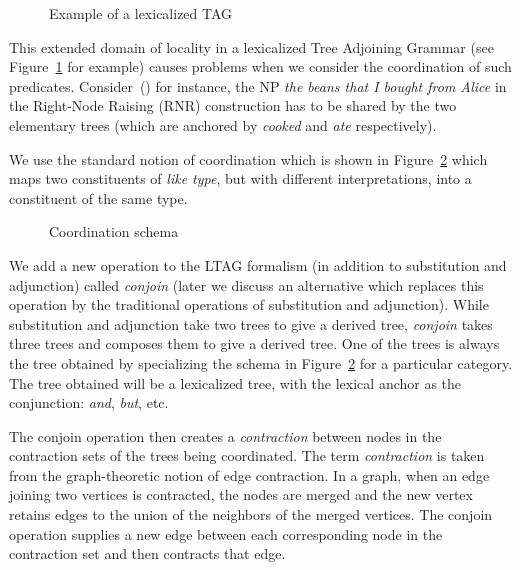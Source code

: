 \begin{figure}[htbp]
  \begin{center}
    \leavevmode
  \end{center}
  \caption{Example of a lexicalized TAG}
  \label{fig:tags}
\end{figure}

This extended domain of locality in a lexicalized Tree Adjoining
Grammar (see Figure~\ref{fig:tags} for example) causes problems when
we consider the coordination of such predicates. Consider~() for
instance, the NP {\em the beans that I bought from Alice} in the
Right-Node Raising (RNR) construction has to be shared by the two
elementary trees (which are anchored by {\em cooked} and {\em ate}
respectively).


We use the standard notion of coordination which is shown in
Figure~\ref{fig:conj} which maps two constituents of {\em like type},
but with different interpretations, into a constituent of the same
type.

\begin{figure}[htbp]
  \begin{center}
    \leavevmode
  \end{center}
  \caption{Coordination schema}
  \label{fig:conj}
\end{figure}

We add a new operation to the LTAG formalism (in addition to
substitution and adjunction) called {\em conjoin} (later we discuss an
alternative which replaces this operation by the traditional
operations of substitution and adjunction). While substitution and
adjunction take two trees to give a derived tree, {\em conjoin\/}
takes three trees and composes them to give a derived tree.  One of
the trees is always the tree obtained by specializing the schema in
Figure~\ref{fig:conj} for a particular category. The tree obtained
will be a lexicalized tree, with the lexical anchor as the
conjunction: {\em and}, {\em but}, etc.

The conjoin operation then creates a {\em contraction\/} between nodes
in the contraction sets of the trees being coordinated.  The term {\em
  contraction\/} is taken from the graph-theoretic notion of edge
contraction. In a graph, when an edge joining two vertices is
contracted, the nodes are merged and the new vertex retains edges to
the union of the neighbors of the merged vertices. The conjoin
operation supplies a new edge between each corresponding node in the
contraction set and then contracts that edge.

